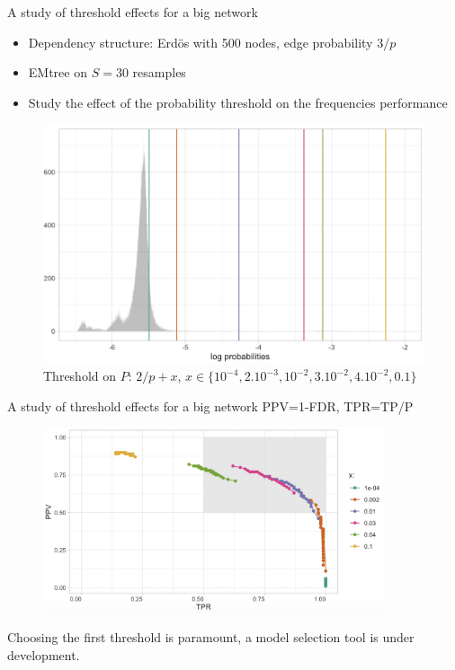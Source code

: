 \documentclass[11pt]{beamer}
\begin{document}
 \begin{frame}{A study of threshold effects for a big network}
 \begin{itemize}
 \item Dependency structure: Erdös with 500 nodes, edge probability $3/p$
 \item EMtree on $S=30$ resamples
 \item Study the effect of the probability threshold on the frequencies performance
 \end{itemize}
    \begin{figure}
    \centering
 \includegraphics[width=0.6\linewidth]{images/prob_thresh.png}
 \caption{Threshold on $P$: $2/p+x$, $x\in \{10^{-4}, 2.10^{-3}, 10^{-2},3.10^{-2}, 4.10^{-2}, 0.1\}$}
   \end{figure}
 \end{frame}
 \begin{frame}{A study of threshold effects for a big network}
 PPV=1-FDR, TPR=TP/P
 \begin{figure}
 \centering
   \includegraphics[width=10cm]{images/PPVTPR_500.png}
 \end{figure}
Choosing the first threshold is paramount, a model selection tool is under development.
 \end{frame}

\end{document}
